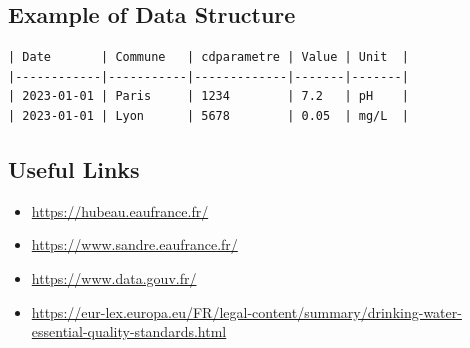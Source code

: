 \documentclass{article}
\begin{document}
\subsection{Example of Data Structure}
\begin{verbatim}
| Date       | Commune   | cdparametre | Value | Unit  |
|------------|-----------|-------------|-------|-------|
| 2023-01-01 | Paris     | 1234        | 7.2   | pH    |
| 2023-01-01 | Lyon      | 5678        | 0.05  | mg/L  |
\end{verbatim}

\subsection{Useful Links}
\begin{itemize}
    \item \url{https://hubeau.eaufrance.fr/}
    \item \url{https://www.sandre.eaufrance.fr/}
    \item \url{https://www.data.gouv.fr/}
    \item \url{https://eur-lex.europa.eu/FR/legal-content/summary/drinking-water-essential-quality-standards.html}
\end{itemize}
\end{document}
